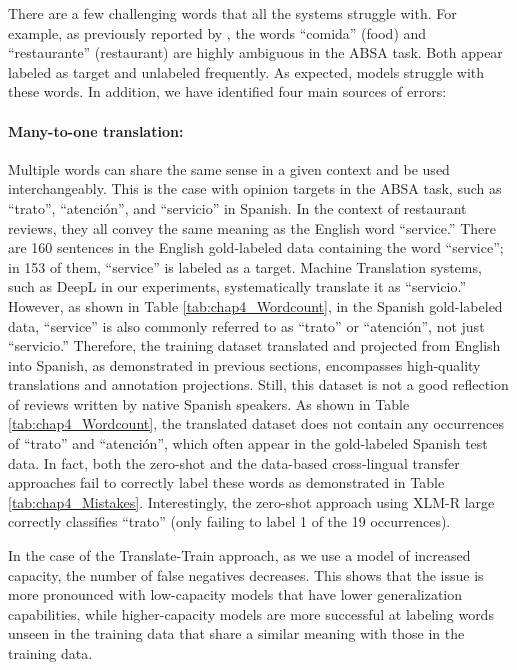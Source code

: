 There are a few challenging words that all the systems struggle with. For example, as previously reported by \cite{AGERRI201985}, the words ``comida'' (food) and ``restaurante'' (restaurant) are highly ambiguous in the ABSA task. Both appear labeled as target and unlabeled frequently. As expected, models struggle with these words. In addition, we have identified four main sources of errors:



\paragraph{Many-to-one translation:} Multiple words can share the same sense in a given context and be used interchangeably. This is the case with opinion targets in the ABSA task, such as ``trato'', ``atención'', and ``servicio'' in Spanish. In the context of restaurant reviews, they all convey the same meaning as the English word ``service.'' There are 160 sentences in the English gold-labeled data containing the word ``service''; in 153 of them, ``service'' is labeled as a target. Machine Translation systems, such as DeepL in our experiments, systematically translate it as ``servicio.'' However, as shown in Table \ref{tab:chap4_Wordcount}, in the Spanish gold-labeled data, ``service'' is also commonly referred to as ``trato'' or ``atención'', not just ``servicio.'' Therefore, the training dataset translated and projected from English into Spanish, as demonstrated in previous sections, encompasses high-quality translations and annotation projections. Still, this dataset is not a good reflection of reviews written by native Spanish speakers. As shown in Table \ref{tab:chap4_Wordcount}, the translated dataset does not contain any occurrences of ``trato'' and ``atención'', which often appear in the gold-labeled Spanish test data. In fact, both the zero-shot and the data-based cross-lingual transfer approaches fail to correctly label these words as demonstrated in Table \ref{tab:chap4_Mistakes}. Interestingly, the zero-shot approach using XLM-R large correctly classifies ``trato'' (only failing to label 1 of the 19 occurrences). 

In the case of the Translate-Train approach, as we use a model of increased capacity, the number of false negatives decreases. This shows that the issue is more pronounced with low-capacity models that have lower generalization capabilities, while higher-capacity models are more successful at labeling words unseen in the training data that share a similar meaning with those in the training data. 

